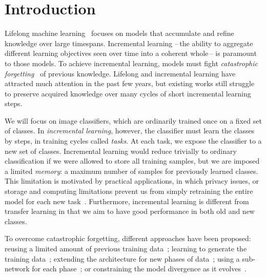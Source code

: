 \documentclass[runningheads]{llncs}
\begin{document}
\section{Introduction}

Lifelong machine learning~\cite{robins1995catastrophicforgetting,french1999catastrophicforgetting,thrun1998lifelonglearning} focuses on models that accumulate and refine knowledge over large timespans. Incremental learning --\,the ability to aggregate different learning objectives seen over time into a coherent whole\,-- is paramount to those models. To achieve incremental learning, models must fight \textit{catastrophic forgetting}~\cite{robins1995catastrophicforgetting,french1999catastrophicforgetting} of previous knowledge. Lifelong and incremental learning have attracted much attention in the past few years, but existing works still struggle to preserve acquired knowledge over many cycles of short incremental learning steps. 

We will focus on image classifiers, which are ordinarily trained once on a fixed set of classes. In \textit{incremental learning}, however, the classifier must learn the classes by steps, in training cycles called \textit{tasks}. At each task, we expose the classifier to a new set of classes. Incremental learning would reduce trivially to ordinary classification if we were allowed to store all training samples, but we are imposed a limited \textit{memory}: a maximum number of samples for previously learned classes. This limitation is motivated by practical applications, in which privacy issues, or storage and computing limitations prevent us from simply retraining the entire model for each new task~\cite{li2018lwf,lomonaco2017core50}. Furthermore, incremental learning is different from transfer learning in that we aim to have good performance in both old and new classes.

To overcome catastrophic forgetting, different approaches have been proposed: reusing a limited amount of previous training data~\cite{rebuffi2017icarl,castro2018end_to_end_inc_learn}; learning to generate the training data~\cite{kemker2018fearnet,shin2017deep_generative_replay}; extending the architecture for new phases of data~\cite{yoon2018dynamically_expandable_networks,li2019learning_to_grow}; using a sub-network for each phase~\cite{fernando2017path_net,golkar2019neural_pruning}; or constraining the model divergence as it evolves~\cite{kirkpatrick2017ewc,lopezpaz2017gem,aljundi2018MemoryAwareSynapses,li2018lwf,rebuffi2017icarl,castro2018end_to_end_inc_learn}. 
\end{document}
